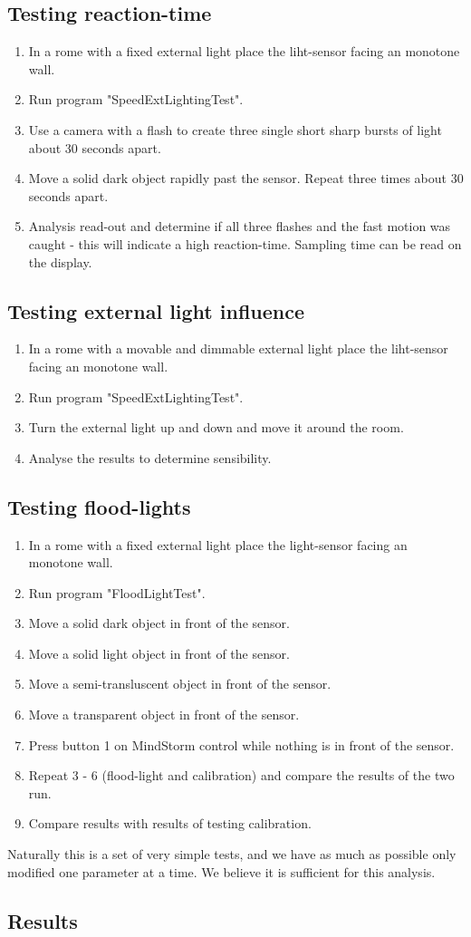 \documentclass[11pt,a4]{article}
\begin{document}
\subsection{Testing reaction-time}
\begin{enumerate}
\item In a rome with a fixed external light place the liht-sensor facing an monotone wall.
\item Run program "SpeedExtLightingTest".
\item Use a camera with a flash to create three single short sharp bursts of light about 30 seconds apart.
\item Move a solid dark object rapidly past the sensor. Repeat three times about 30 seconds apart.
\item Analysis read-out and determine if all three flashes and the fast motion was caught - this will indicate a high reaction-time. Sampling time can be read on the display.
\end{enumerate}

\subsection{Testing external light influence}
\begin{enumerate}
\item In a rome with a movable and dimmable external light place the liht-sensor facing an monotone wall.
\item Run program "SpeedExtLightingTest".
\item Turn the external light up and down and move it around the room.
\item Analyse the results to determine sensibility.
\end{enumerate}

\subsection{Testing flood-lights}
\begin{enumerate}
\item In a rome with a fixed external light place the light-sensor facing an monotone wall.
\item Run program "FloodLightTest".
\item Move a solid dark object in front of the sensor.
\item Move a solid light object in front of the sensor.
\item Move a semi-transluscent object in front of the sensor.
\item Move a transparent object in front of the sensor.
\item Press button 1 on MindStorm control while nothing is in front of the sensor.
\item Repeat 3 - 6 (flood-light and calibration) and compare the results of the two run.
\item Compare results with results of testing calibration.
\end{enumerate}

Naturally this is a set of very simple tests, and we have as much as possible only modified one parameter at a time. We believe it is sufficient for this analysis.

\subsection{Results}
\end{document}
